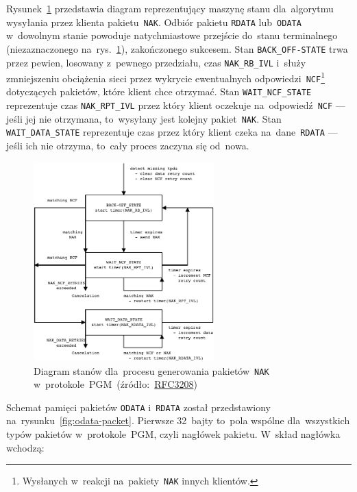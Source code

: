 \documentclass[thesis]{subfiles}
\begin{document}
Rysunek~\ref{fig:NAKflow} przedstawia diagram reprezentujący maszynę stanu dla~algorytmu wysyłania przez klienta pakietu~\texttt{NAK}. Odbiór pakietu \texttt{RDATA} lub~\texttt{ODATA} w~dowolnym stanie powoduje natychmiastowe przejście do~stanu terminalnego (niezaznaczonego na~rys.~\ref{fig:NAKflow}), zakończonego sukcesem. Stan \texttt{BACK\_OFF-STATE} trwa przez pewien, losowany z~pewnego przedziału, czas \texttt{NAK\_RB\_IVL} i~służy zmniejszeniu obciążenia sieci przez wykrycie ewentualnych odpowiedzi~\texttt{NCF}\footnote{Wysłanych w~reakcji na~pakiety~\texttt{NAK} innych klientów.} dotyczących pakietów, które klient chce otrzymać. Stan \texttt{WAIT\_NCF\_STATE} reprezentuje czas \texttt{NAK\_RPT\_IVL} przez który klient oczekuje na~odpowiedź~\texttt{NCF} --- jeśli jej nie otrzymana, to~wysyłany jest kolejny pakiet~\texttt{NAK}. Stan \texttt{WAIT\_DATA\_STATE} reprezentuje czas przez który klient czeka na~dane~\texttt{RDATA} --- jeśli ich nie otrzyma, to~cały proces zaczyna się od~nowa.

\begin{figure}
	\centering
	\includegraphics[width=0.62\textwidth]{img/PGF_protocol_NAK_flow_diagram}
	\caption{Diagram stanów dla~procesu generowania pakietów~\texttt{NAK} w~protokole~PGM~(źródło:~\href{https://tools.ietf.org/html/rfc3208\#page-25}{RFC3208})~\cite{pgm-rfc}}
	\label{fig:NAKflow}
\end{figure}

Schemat pamięci pakietów \texttt{ODATA} i~\texttt{RDATA} został przedstawiony na~rysunku~\ref{fig:odata-packet}. Pierwsze 32~bajty to~pola wspólne dla~wszystkich typów pakietów w~protokole~PGM, czyli nagłówek pakietu. W~skład nagłówka wchodzą:\mynobreakpar
\end{document}
